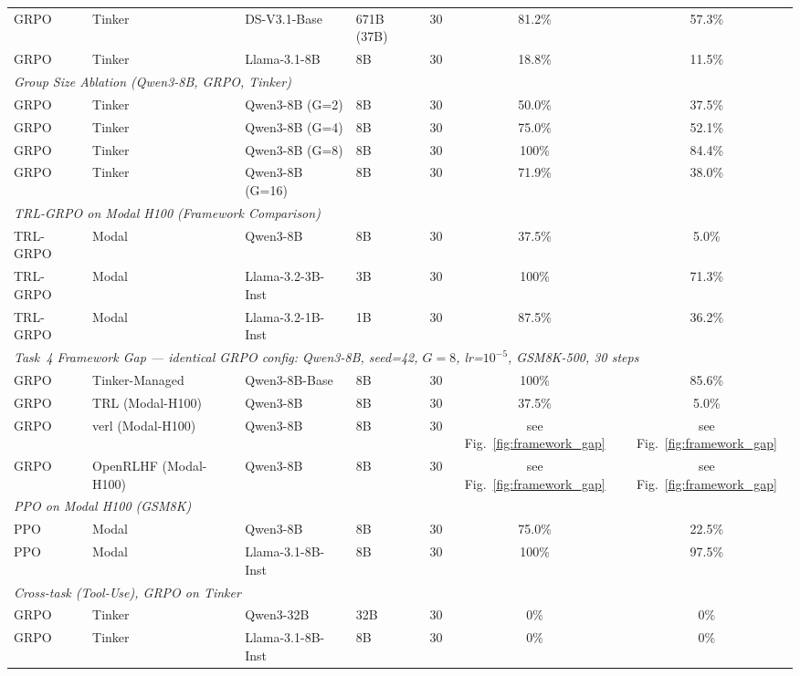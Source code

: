 \documentclass{article}
\begin{document}
\begin{table}[t]
\begin{tabular}{@{}l l l l r c c@{}}
GRPO & Tinker & DS-V3.1-Base & 671B (37B) & 30 & 81.2\% & 57.3\% \\
GRPO & Tinker & Llama-3.1-8B & 8B & 30 & 18.8\% & 11.5\% \\
\midrule
\multicolumn{7}{l}{\textit{Group Size Ablation (Qwen3-8B, GRPO, Tinker)}} \\
\midrule
GRPO & Tinker & Qwen3-8B (G=2) & 8B & 30 & 50.0\% & 37.5\% \\
GRPO & Tinker & Qwen3-8B (G=4) & 8B & 30 & 75.0\% & 52.1\% \\
GRPO & Tinker & Qwen3-8B (G=8) & 8B & 30 & 100\% & 84.4\% \\
GRPO & Tinker & Qwen3-8B (G=16) & 8B & 30 & 71.9\% & 38.0\% \\
\midrule
\multicolumn{7}{l}{\textit{TRL-GRPO on Modal H100 (Framework Comparison)}} \\
\midrule
TRL-GRPO & Modal & Qwen3-8B & 8B & 30 & 37.5\% & 5.0\% \\
TRL-GRPO & Modal & Llama-3.2-3B-Inst & 3B & 30 & 100\% & 71.3\% \\
TRL-GRPO & Modal & Llama-3.2-1B-Inst & 1B & 30 & 87.5\% & 36.2\% \\
\midrule
\multicolumn{7}{l}{\textit{Task~4 Framework Gap --- identical GRPO config: Qwen3-8B, seed=42, $G=8$, lr=$10^{-5}$, GSM8K-500, 30 steps}} \\
\midrule
GRPO & Tinker-Managed & Qwen3-8B-Base & 8B & 30 & 100\% & 85.6\% \\
GRPO & TRL (Modal-H100) & Qwen3-8B & 8B & 30 & 37.5\% & 5.0\% \\
GRPO & verl (Modal-H100) & Qwen3-8B & 8B & 30 & see Fig.~\ref{fig:framework_gap} & see Fig.~\ref{fig:framework_gap} \\
GRPO & OpenRLHF (Modal-H100) & Qwen3-8B & 8B & 30 & see Fig.~\ref{fig:framework_gap} & see Fig.~\ref{fig:framework_gap} \\
\midrule
\multicolumn{7}{l}{\textit{PPO on Modal H100 (GSM8K)}} \\
\midrule
PPO & Modal & Qwen3-8B & 8B & 30 & 75.0\% & 22.5\% \\
PPO & Modal & Llama-3.1-8B-Inst & 8B & 30 & 100\% & 97.5\% \\
\midrule
\multicolumn{7}{l}{\textit{Cross-task (Tool-Use), GRPO on Tinker}} \\
\midrule
GRPO & Tinker & Qwen3-32B & 32B & 30 & 0\% & 0\% \\
GRPO & Tinker & Llama-3.1-8B-Inst & 8B & 30 & 0\% & 0\% \\
\bottomrule
\end{tabular}
\end{table}
\end{document}
